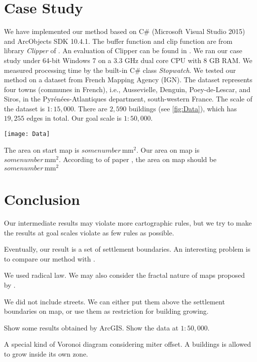 \section{Case Study}
\label{sec:CaseStudy}
We have implemented our method based on
C\# (Microsoft Visual Studio 2015) and ArcObjects SDK 10.4.1.
The buffer function and clip function are from library \emph{Clipper} 
of \citet{Johnson2014}.
An evaluation of Clipper can be found in \citet{Palfrader2015}.
We ran our case study under 64-bit 
Windows 7 on a 3.3 GHz dual core CPU with 8 GB RAM.
We measured processing time by the built-in C\# class 
\emph{Stopwatch}.
We tested our method on a dataset from French Mapping Agency (IGN).
The dataset represents four towns (communes in French), i.e., Aussevielle, 
Denguin,  Poey-de-Lescar, and Siros, in the 
Pyr\'en\'ees-Atlantiques department, south-western France.
The scale of the dataset is $1:15{,}000$.
There are $2{,}590$ buildings (see \fig\ref{fig:Data}), 
which has $19{,}255$ edges in total.
Our goal scale is $1:50{,}000$.


\begin{figure*}[tb]
	\centering
	\texttt{[image: Data]}
	\caption{data.}
	\label{fig:Data}
\end{figure*}



The area on start map is $some number\,\text{mm}^2$.
Our area on map is $some number\,\text{mm}^2$.
According to  of paper \citet{Topfer1966}, 
the area on map should be $some number\,\text{mm}^2$


\section{Conclusion}
\label{sec:Conclusion}


Our intermediate results may violate more cartographic rules, but we try to 
make the results at goal scales violate as few rules as possible.


Eventually, our result is a set of settlement boundaries. An interesting 
problem is to compare our method with \citet{Chaudhry2008}.

We used radical law. We may also consider the fractal nature of maps proposed 
by \citet{Jiang2015}.

We did not include streets. We can either put them above the settlement 
boundaries on map, or use them as restriction for building growing.

Show some results obtained by ArcGIS.
Show the data at $1:50{,}000$.

A special kind of Voronoi diagram considering miter offset. A buildings is 
allowed to grow inside its own zone.

